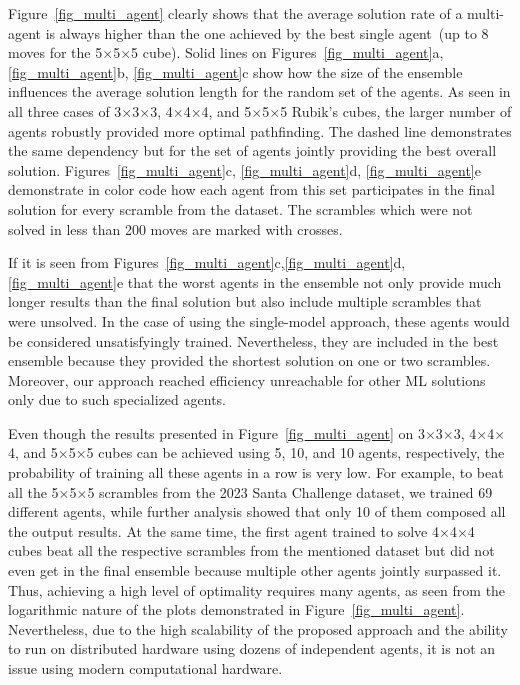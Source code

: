 Figure~\ref{fig_multi_agent} clearly shows that the average solution rate of a multi-agent is always higher than the one achieved by the best single agent~(up to 8 moves for the 5$\times$5$\times$5 cube). Solid lines on Figures~\ref{fig_multi_agent}a, \ref{fig_multi_agent}b, \ref{fig_multi_agent}c show how the size of the ensemble influences the average solution length for the random set of the agents. As seen in all three cases of 3$\times$3$\times$3, 4$\times$4$\times$4, and 5$\times$5$\times$5 Rubik's cubes, the larger number of agents robustly provided more optimal pathfinding. The dashed line demonstrates the same dependency but for the set of agents jointly providing the best overall solution. Figures~\ref{fig_multi_agent}c, \ref{fig_multi_agent}d, \ref{fig_multi_agent}e demonstrate in color code how each agent from this set participates in the final solution for every scramble from the dataset. The scrambles which were not solved in less than 200 moves are marked with crosses.

If it is seen from Figures~\ref{fig_multi_agent}c,\ref{fig_multi_agent}d,\ref{fig_multi_agent}e that the worst agents in the ensemble not only provide much longer results than the final solution but also include multiple scrambles that were unsolved. In the case of using the single-model approach, these agents would be considered unsatisfyingly trained. Nevertheless, they are included in the best ensemble because they provided the shortest solution on one or two scrambles. Moreover, our approach reached efficiency unreachable for other ML solutions only due to such specialized agents.

Even though the results presented in Figure~\ref{fig_multi_agent} on 3$\times$3$\times$3, 4$\times$4$\times$4, and 5$\times$5$\times$5 cubes can be achieved using 5, 10, and 10 agents, respectively, the probability of training all these agents in a row is very low. For example, to beat all the 5$\times$5$\times$5 scrambles from the 2023 Santa Challenge dataset, we trained 69 different agents, while further analysis showed that only 10 of them composed all the output results. At the same time, the first agent trained to solve 4$\times$4$\times$4 cubes beat all the respective scrambles from the mentioned dataset but did not even get in the final ensemble because multiple other agents jointly surpassed it. Thus, achieving a high level of optimality requires many agents, as seen from the logarithmic nature of the plots demonstrated in Figure~\ref{fig_multi_agent}. Nevertheless, due to the high scalability of the proposed approach and the ability to run on distributed hardware using dozens of independent agents, it is not an issue using modern computational hardware.
